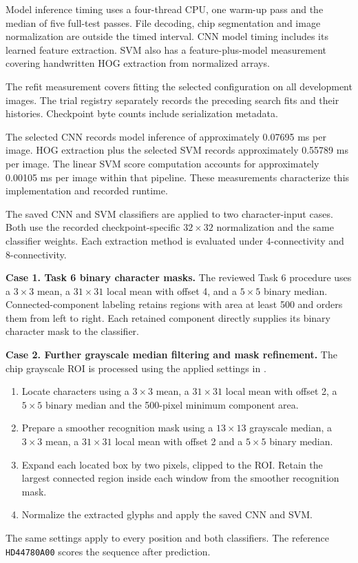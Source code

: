 
Model inference timing uses a four-thread CPU, one warm-up pass and the median of five full-test passes. File decoding, chip segmentation and image normalization are outside the timed interval. CNN model timing includes its learned feature extraction. SVM also has a feature-plus-model measurement covering handwritten HOG extraction from normalized arrays.

The refit measurement covers fitting the selected configuration on all development images. The trial registry separately records the preceding search fits and their histories. Checkpoint byte counts include serialization metadata.

The selected CNN records model inference of approximately 0.07695 ms per image. HOG extraction plus the selected SVM records approximately 0.55789 ms per image. The linear SVM score computation accounts for approximately 0.00105 ms per image within that pipeline. These measurements characterize this implementation and recorded runtime.

The saved CNN and SVM classifiers are applied to two character-input cases. Both use the recorded checkpoint-specific $32\times32$ normalization and the same classifier weights. Each extraction method is evaluated under 4-connectivity and 8-connectivity.

\textbf{Case 1. Task 6 binary character masks.} The reviewed Task 6 procedure uses a $3\times3$ mean, a $31\times31$ local mean with offset 4, and a $5\times5$ binary median. Connected-component labeling retains regions with area at least 500 and orders them from left to right. Each retained component directly supplies its binary character mask to the classifier.

\textbf{Case 2. Further grayscale median filtering and mask refinement.} The chip grayscale ROI is processed using the applied settings in .
\begin{enumerate}
\item Locate characters using a $3\times3$ mean, a $31\times31$ local mean with offset 2, a $5\times5$ binary median and the 500-pixel minimum component area.
\item Prepare a smoother recognition mask using a $13\times13$ grayscale median, a $3\times3$ mean, a $31\times31$ local mean with offset 2 and a $5\times5$ binary median.
\item Expand each located box by two pixels, clipped to the ROI. Retain the largest connected region inside each window from the smoother recognition mask.
\item Normalize the extracted glyphs and apply the saved CNN and SVM.
\end{enumerate}
The same settings apply to every position and both classifiers. The reference \texttt{HD44780A00} scores the sequence after prediction.

